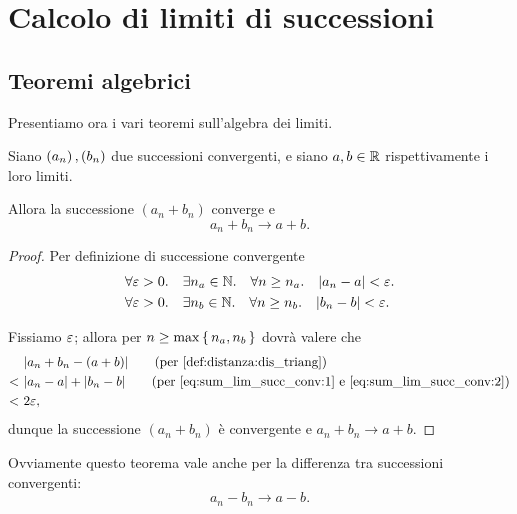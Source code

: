 \section{Calcolo di limiti di successioni}

\subsection{Teoremi algebrici}

Presentiamo ora i vari teoremi sull'algebra dei limiti.

\begin{proposition}
    \label{prop:sum_lim_succ_conv}
    Siano $\seqn*{a}, \seqn*{b}$ due successioni convergenti, e siano $a, b \in \mathbb{R}$ rispettivamente i loro limiti. 
    
    Allora la successione $\left( a_n + b_n \right)$ converge e  \[
        a_n + b_n \to a + b.
    \]
\end{proposition}
\begin{proof}
    Per definizione di successione convergente \begin{align}
        &\forall \eps > 0. \quad \exists n_a \in \N. \quad \forall n \geq n_a. \quad \abs*{a_n - a} < \eps. \label{eq:sum_lim_succ_conv:1}\\
        &\forall \eps > 0. \quad \exists n_b \in \N. \quad \forall n \geq n_b. \quad \abs*{b_n - b} < \eps. \label{eq:sum_lim_succ_conv:2}
    \end{align}

    Fissiamo $\varepsilon$; allora per $n \geq \max \left\{\,n_a, n_b\,\right\}$ dovrà valere che \begin{align*}
        &\abs*{a_n + b_n - (a+b)} \tag{per \ref{def:distanza:dis_triang}}\\
        <\ &\abs*{a_n - a} + \abs*{b_n - b}  \tag{per \eqref{eq:sum_lim_succ_conv:1} e \eqref{eq:sum_lim_succ_conv:2}}\\
        <\ &2\eps,
    \end{align*}
    dunque la successione $\left(a_n + b_n\right)$ è convergente e $a_n + b_n \to a + b$.
\end{proof}

\begin{remark}
    Ovviamente questo teorema vale anche per la differenza tra successioni convergenti: \[
        a_n - b_n \to a - b.    
    \]
\end{remark}

